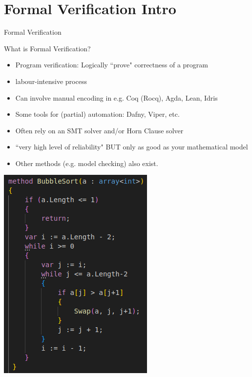\documentclass{beamer}
\begin{document}
\section{Formal Verification Intro}
\begin{frame}{Formal Verification}
\begin{block}{What is Formal Verification?}
\begin{itemize} 
	\item Program verification: Logically ``prove" correctness of a program
	\item labour-intensive process
	\item Can involve manual encoding in e.g. Coq (Rocq), Agda, Lean, Idris
	\item Some tools for (partial) automation: Dafny, Viper, etc.
	\item Often rely on an SMT solver and/or Horn Clause solver
	\item ``very high level of reliability" BUT only as good as your mathematical model 
	\item Other methods (e.g. model checking) also exist.
\end{itemize} 
\end{block}
\end{frame}


\begin{frame}
\includegraphics[scale=0.6]{pictures/verification/bubblesort.png}
\end{frame}
\end{document}
